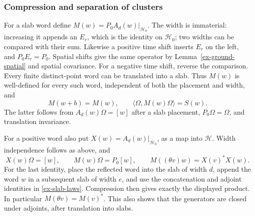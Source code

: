 \subsubsection{Compression and separation of clusters}
For a slab word define
\(M(w)=P_0A_d(w)|_{\mathcal H_0}\). The width is immaterial:
increasing it appends an \(E_r\), which is the identity on
\(\mathcal H_0\); two widths can be compared with their sum.
Likewise a positive time shift inserts \(E_r\) on the left, and
\(P_0E_r=P_0\). Spatial shifts give the same operator by
Lemma~\ref{ex-ground-spatial} and spatial covariance. For a negative
time shift, reverse the comparison. Every finite distinct-point word can
be translated into a slab. Thus \(M(w)\) is well-defined for every such
word, independent of both the placement and width, and
\begin{equation}\label{ex-compression-values}
 M(w+b)=M(w),\qquad
 \langle\Omega,M(w)\Omega\rangle=S(w).
\end{equation}
The latter follows from \(A_d(w)\Omega=[w]\) after a slab placement,
\(P_0\Omega=\Omega\), and translation invariance.

For a positive word also put \(X(w)=A_d(w)|_{\mathcal H_0}\), as a map
into \(\mathcal H\). Width independence follows as above, and
\[
 X(w)\Omega=[w],\qquad M(w)\Omega=P_0[w],\qquad
 M((\theta v)w)=X(v)^*X(w).
\]
For the last identity, place the reflected word into the slab of width
\(d\), append the word \(w\) in a subsequent slab of width \(e\),
and use the concatenation and adjoint identities in
\eqref{ex-slab-laws}. Compression then gives exactly the displayed
product. In particular \(M(\theta v)=M(v)^*\). This also shows that
the generators are closed under adjoints, after translation into slabs.

